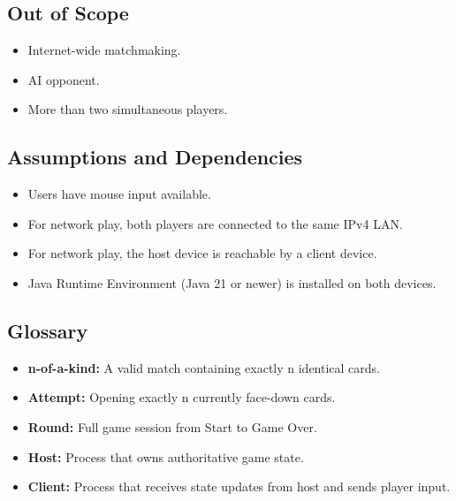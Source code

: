 \documentclass[a4paper,12pt]{article}
\begin{document}
    \subsection{Out of Scope}
    \begin{itemize}[itemsep=0pt,topsep=0pt,parsep=0pt,partopsep=0pt]
        \item Internet-wide matchmaking.
        \item AI opponent.
        \item More than two simultaneous players.
    \end{itemize}

    \subsection{Assumptions and Dependencies}
    \begin{itemize}[itemsep=0pt,topsep=0pt,parsep=0pt,partopsep=0pt]
        \item Users have mouse input available.
        \item For network play, both players are connected to the same IPv4 LAN.
        \item For network play, the host device is reachable by a client device.
        \item Java Runtime Environment (Java 21 or newer) is installed on both devices.
    \end{itemize}

    \subsection{Glossary}
    \begin{itemize}[itemsep=0pt,topsep=0pt,parsep=0pt,partopsep=0pt]
        \item \textbf{n-of-a-kind:} A valid match containing exactly n identical cards.
        \item \textbf{Attempt:} Opening exactly n currently face-down cards.
        \item \textbf{Round:} Full game session from Start to Game Over.
        \item \textbf{Host:} Process that owns authoritative game state.
        \item \textbf{Client:} Process that receives state updates from host and sends player input.
    \end{itemize}
\end{document}
